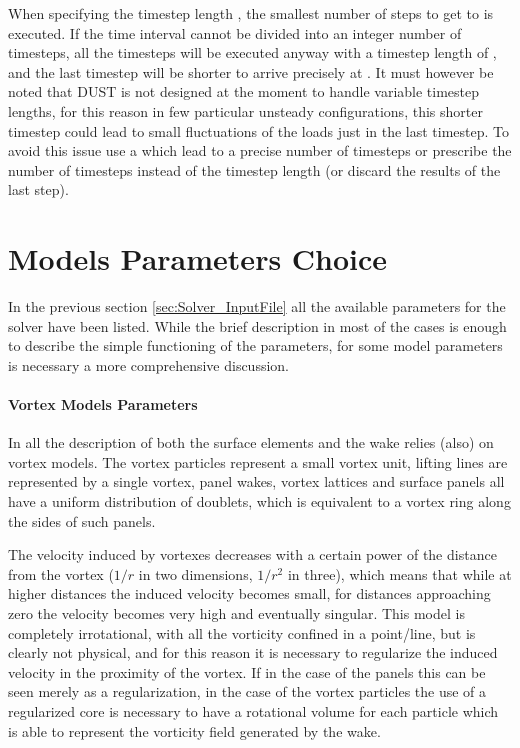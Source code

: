 When specifying the timestep length , the smallest number of 
steps to get to  is executed. If the time interval cannot be 
divided into an integer number of timesteps, all the timesteps will be 
executed anyway with a timestep length of , and the last timestep 
will be shorter to arrive precisely at . It must however be 
noted that DUST is not designed at the moment to handle variable timestep 
lengths, for this reason in few particular unsteady configurations, this 
shorter timestep could lead to small fluctuations of the loads just in the 
last timestep. To avoid this issue use a  which lead to a precise 
number of timesteps or prescribe the number of timesteps instead of the 
timestep length (or discard the results of the last step). 

\section{Models Parameters Choice}
\label{sec:Solver_ParametersChoice}
In the previous section \ref{sec:Solver_InputFile} all the available 
parameters for the \DUST{} solver have been listed. While the brief 
description in most of the cases is enough to describe the simple 
functioning of the parameters, for some model parameters is necessary 
a more comprehensive discussion. 

\paragraph{Vortex Models Parameters}

In \DUST{} all the description of both the surface elements and 
the wake relies (also) on vortex models. The vortex particles 
represent a small vortex unit, lifting lines are represented by 
a single vortex, panel wakes, vortex lattices and surface panels 
all have a uniform distribution of doublets, which is equivalent 
to a vortex ring along the sides of such panels. 

The velocity induced by vortexes decreases with a certain power 
of the distance from the vortex ($1/r$ in two dimensions, $1/r^2$ in three), 
which means that while at higher distances the induced velocity becomes 
small, for distances approaching zero the velocity becomes very high 
and eventually singular. This model is completely irrotational, with 
all the vorticity confined in a point/line, but is clearly not physical, 
and for this reason it is necessary to regularize the induced velocity 
in the proximity of the vortex. If in the case of the panels this can 
be seen merely as a regularization, in the case of the vortex particles 
the use of a regularized core is necessary to have a rotational volume 
for each particle which is able to represent the vorticity field generated 
by the wake. 

